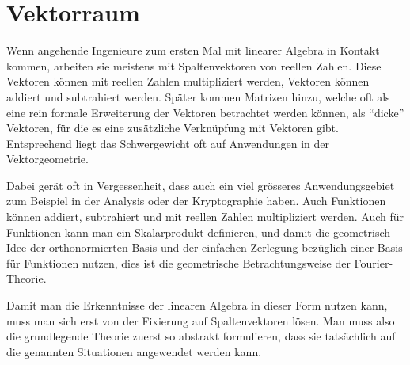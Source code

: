 %
%
%
\chapter{Vektorraum%
\label{chapter:vektorraum}}
\rhead{}
Wenn angehende Ingenieure zum ersten Mal mit linearer Algebra in
Kontakt kommen, arbeiten sie meistens mit Spaltenvektoren von
reellen Zahlen.
Diese Vektoren können mit reellen Zahlen multipliziert werden,
Vektoren können addiert und subtrahiert werden.
Später kommen Matrizen hinzu, welche oft als eine rein formale
Erweiterung der Vektoren betrachtet werden können, als ``dicke''
Vektoren, für die es eine zusätzliche Verknüpfung mit Vektoren
gibt.
Entsprechend liegt das Schwergewicht oft auf Anwendungen in der
Vektorgeometrie.

Dabei gerät oft in Vergessenheit, dass auch ein viel grösseres
Anwendungsgebiet zum Beispiel in der Analysis oder der Kryptographie
haben.
Auch Funktionen können addiert, subtrahiert und mit reellen Zahlen
multipliziert werden.
Auch für Funktionen kann man ein Skalarprodukt definieren, und
damit die geometrisch Idee der orthonormierten Basis und der
einfachen Zerlegung bezüglich einer Basis für Funktionen nutzen,
dies ist die geometrische Betrachtungsweise der Fourier-Theorie.

Damit man die Erkenntnisse der linearen Algebra in dieser Form
nutzen kann, muss man sich erst von der Fixierung auf Spaltenvektoren
lösen.
Man muss also die grundlegende Theorie zuerst so abstrakt formulieren,
dass sie tatsächlich auf die genannten Situationen angewendet werden 
kann.










